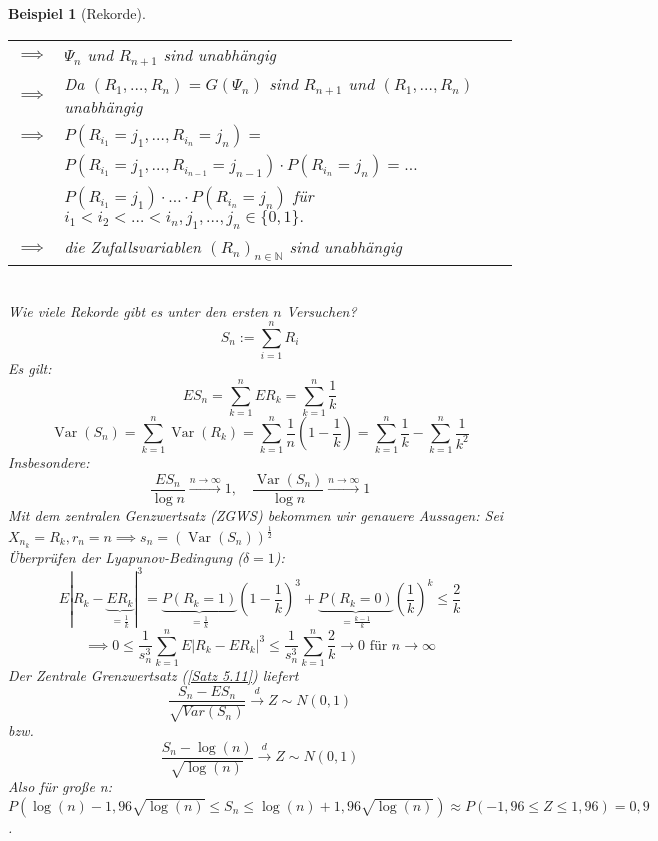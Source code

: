 \documentclass[a4paper,11pt]{book}
\newcommand{\N}{{\mathbb N}}
\DeclareMathOperator{\var}{Var}
\def\folgt{\ensuremath{\implies}}
\def\dto{\stackrel{d}{\rightarrow}}
\newtheorem{Bsp}{Beispiel}[chapter]
\theoremstyle{nonumberplain}
\begin{document}
\begin{Bsp}[Rekorde]
\begin{tabular}[b]{rp{}}
$\folgt$ & $\Psi_n$ und $R_{n+1}$ sind unabhängig\\
$\folgt$ & Da $(R_1, \ldots, R_n) = G(\Psi_n)$ sind $R_{n+1}$ und $(R_1,\ldots,R_n)$ unabhängig\\
$\folgt$& $P(R_{i_1}=j_1,\ldots,R_{i_n}=j_n) =$\\
&$P(R_{i_1}=j_1,\ldots,R_{i_{n-1}}=j_{n-1})\cdot P(R_{i_n}=j_n) = \ldots$\\
&$P(R_{i_1}=j_1)\cdot\ldots\cdot P(R_{i_n} = j_n)$ für $i_1<i_2<\ldots<i_n, j_1,\ldots,j_n\in\{0,1\}.$\\
$\folgt$ & die Zufallsvariablen $(R_n)_{n\in\N}$ sind unabhängig
\end{tabular}\\
Wie viele Rekorde gibt es unter den ersten $n$ Versuchen?
$$S_n:=\sum_{i=1}^n R_i$$
Es gilt:
$$ES_n = \sum_{k=1}^n ER_k = \sum_{k=1}^n \frac 1 k$$
$$\var(S_n) = \sum_{k=1}^n\var(R_k) = \sum_{k=1}^n\frac 1 n (1 - \frac 1 k ) = \sum_{k=1}^n\frac 1 k - \sum_{k=1}^n \frac 1 {k^2}$$
Insbesondere:
$$\frac{ES_n}{\log n}\stackrel{n\to\infty}{\to}1,\quad\frac{\var(S_n)}{\log n}\stackrel{n\to\infty}{\to}1$$
Mit dem zentralen Genzwertsatz (ZGWS) bekommen wir genauere Aussagen: Sei $X_{n_k} = R_k, r_n = n \folgt s_n = \left(\var(S_n)\right)^{\frac 1 2}$\\
Überprüfen der Lyapunov-Bedingung ($\delta = 1$):
$$E|R_k - \underbrace{ER_k}_{= \frac 1 k}|^3 = \underbrace{P(R_k=1)}_{=\frac 1 k}(1-\frac 1 k )^3 + \underbrace{P(R_k = 0)}_{=\frac {k-1} k}\left(\frac 1 k\right)^k\le\frac 2 k$$
$$\folgt 0\le\frac 1 {s_n^3}\sum_{k=1}^n E|R_k-ER_k|^3\le\frac 1 {s_n^3}\sum_{k=1}^n\frac 2 k\to 0 \text{ für } n\to\infty$$
Der Zentrale Grenzwertsatz (\ref{Satz 5.11}) liefert $$\frac{S_n - ES_n}{\sqrt{Var (S_n)}} \dto Z\sim N(0,1)$$ bzw. $$\frac{S_n - \log(n)}{\sqrt{\log(n)}} \dto Z\sim N(0,1)$$
Also für große n: $P(\log(n) - 1,96\sqrt{\log(n)} \leq S_n \leq \log(n) + 1,96\sqrt{\log(n)}) \approx P(-1,96 \leq Z \leq 1,96) = 0,9$.
\end{Bsp}
\end{document}
